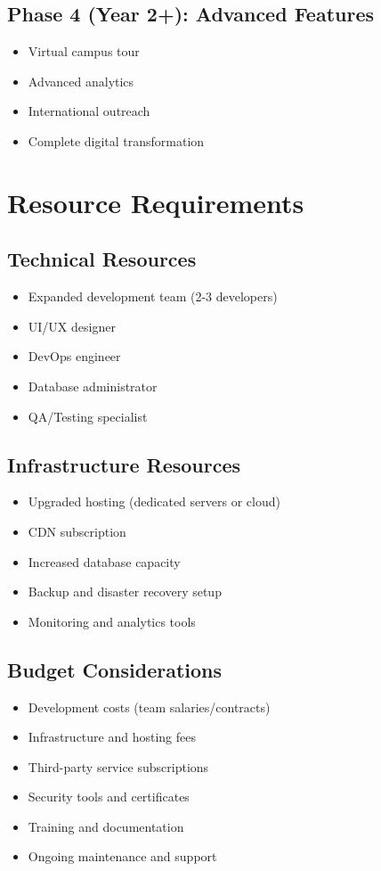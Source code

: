 \documentclass[12pt,a4paper]{report}
\begin{document}
\subsection{Phase 4 (Year 2+): Advanced Features}
\begin{itemize}
    \item Virtual campus tour
    \item Advanced analytics
    \item International outreach
    \item Complete digital transformation
\end{itemize}

\section{Resource Requirements}

\subsection{Technical Resources}
\begin{itemize}
    \item Expanded development team (2-3 developers)
    \item UI/UX designer
    \item DevOps engineer
    \item Database administrator
    \item QA/Testing specialist
\end{itemize}

\subsection{Infrastructure Resources}
\begin{itemize}
    \item Upgraded hosting (dedicated servers or cloud)
    \item CDN subscription
    \item Increased database capacity
    \item Backup and disaster recovery setup
    \item Monitoring and analytics tools
\end{itemize}

\subsection{Budget Considerations}
\begin{itemize}
    \item Development costs (team salaries/contracts)
    \item Infrastructure and hosting fees
    \item Third-party service subscriptions
    \item Security tools and certificates
    \item Training and documentation
    \item Ongoing maintenance and support
\end{itemize}
\end{document}
